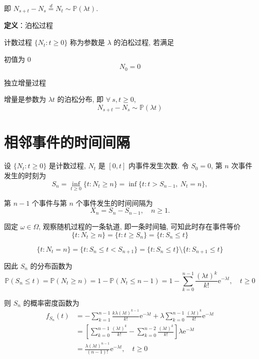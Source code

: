 \documentclass[openany]{ctexbook}
\theoremstyle{kaiti}
\theoremstyle{normal}
\begin{document}
  即 $N_{s+t}-N_s\overset{d}{=}N_t\sim \mathbb{P}(\lambda t)$.
  
\textbf{定义}：泊松过程
  
  计数过程 $\{N_t:t\geqslant0\}$ 称为参数是 $\lambda$ 的泊松过程, 若满足

初值为 $0$
\begin{equation}
    N_0=0
\end{equation}
  

独立增量过程

增量是参数为 $\lambda t$ 的泊松分布, 即 $\forall~s,t\geqslant0$, 
\begin{equation}
    N_{s+t}-N_s\sim \mathbb{P}(\lambda t)
\end{equation}
  
\section{相邻事件的时间间隔}
  
  设 $\{N_t:t\geqslant0\}$ 是计数过程, $N_t$ 是 $[0,t]$ 内事件发生次数. 令 $S_0=0$, 第 $n$ 次事件发生的时刻为
\begin{equation}
    S_n=\inf_{t\geqslant0}\{t:N_t\geqslant n\}=\inf\{t:t>S_{n-1},~N_t=n\},
\end{equation}
  
  第 $n-1$ 个事件与第 $n$ 个事件发生的时间间隔为
\begin{equation}
    X_n=S_n-S_{n-1},\quad n\geqslant1.
\end{equation}
  
  固定 $\omega\in\Omega$, 观察随机过程的一条轨道, 即一条时间轴, 可知此时存在事件等价
\begin{equation}
    \{t:N_t\geqslant n\}=\{t:t\geqslant S_n\}=\{t:S_n\leqslant t\}
\end{equation}
  
\begin{equation}
    \{t:N_t=n\}=\{t:S_n\leqslant t< S_{n+1}\}=\{t:S_n\leqslant t\}\setminus\{t:S_{n+1}\leqslant t\}
\end{equation}
  
  因此 $S_n$ 的分布函数为
\begin{equation}
    \mathbb{P}(S_n\leqslant t)=\mathbb{P}(N_t\geqslant n)=1-\mathbb{P}(N_t\leqslant n-1)=1-\sum_{k=0}^{n-1}\frac{(\lambda t)^k}{k!}\mathrm{e}^{-\lambda t},\quad t\geqslant0
\end{equation}
  
  则 $S_n$ 的概率密度函数为
\begin{equation}
    \begin{aligned}
      f_{S_n}(t)
      &=-\sum_{k=1}^{n-1}\frac{k\lambda(\lambda t)^{k-1}}{k!}\mathrm{e}^{-\lambda t}+\lambda\sum_{k=0}^{n-1}\frac{(\lambda t)^k}{k!}\mathrm{e}^{-\lambda t}\\
      &=\left[\sum_{k=0}^{n-1}\frac{(\lambda t)^k}{k!}-\sum_{k=0}^{n-2}\frac{(\lambda t)^k}{k!}\right]\lambda\mathrm{e}^{-\lambda t}\\
      &=\frac{\lambda(\lambda t)^{n-1}}{(n-1)!}\mathrm{e}^{-\lambda t},\quad t\geqslant0\\
    \end{aligned}
\end{equation}
  
\end{document}
